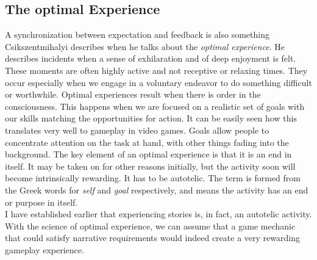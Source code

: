 \subsection{The optimal Experience}
A synchronization between expectation and feedback is also something Csikszentmihalyi describes when he talks about the \textit{optimal experience}. He describes incidents when a sense of exhilaration and of deep enjoyment is felt. These moments are often highly active and not receptive or relaxing times. They occur especially when we engage in a voluntary endeavor to do something difficult or worthwhile. Optimal experiences result when there is order in the consciousness. This happens when we are focused on a realistic set of goals with our skills matching the opportunities for action. It can be easily seen how this translates very well to gameplay in video games. Goals allow people to concentrate attention on the task at hand, with other things fading into the background. The key element of an optimal experience is that it is an end in itself. It may be taken on for other reasons initially, but the activity soon will become intrinsically rewarding. It has to be autotelic. The term is formed from the Greek words for \textit{self} and \textit{goal} respectively, and means the activity has an end or purpose in itself.~\cite{Csikszentmihalyi1990}\\
I have established earlier that experiencing stories is, in fact, an autotelic activity. With the science of optimal experience, we can assume that a game mechanic that could satisfy narrative requirements would indeed create a very rewarding gameplay experience.
